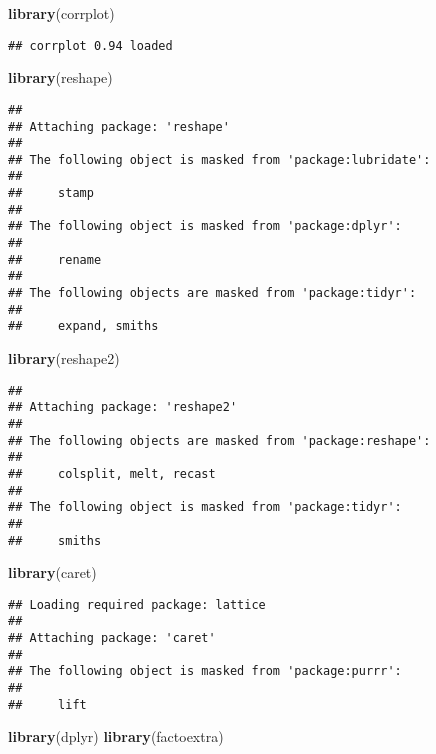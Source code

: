 \documentclass[
]{article}
\newenvironment{Shaded}{\begin{snugshade}}{\end{snugshade}}
\newcommand{\FunctionTok}[1]{\textcolor[rgb]{0.13,0.29,0.53}{\textbf{#1}}}
\newcommand{\NormalTok}[1]{#1}
\begin{document}
\begin{Shaded}
\begin{Highlighting}[]
\FunctionTok{library}\NormalTok{(corrplot)}
\end{Highlighting}
\end{Shaded}

\begin{verbatim}
## corrplot 0.94 loaded
\end{verbatim}

\begin{Shaded}
\begin{Highlighting}[]
\FunctionTok{library}\NormalTok{(reshape)}
\end{Highlighting}
\end{Shaded}

\begin{verbatim}
## 
## Attaching package: 'reshape'
## 
## The following object is masked from 'package:lubridate':
## 
##     stamp
## 
## The following object is masked from 'package:dplyr':
## 
##     rename
## 
## The following objects are masked from 'package:tidyr':
## 
##     expand, smiths
\end{verbatim}

\begin{Shaded}
\begin{Highlighting}[]
\FunctionTok{library}\NormalTok{(reshape2)}
\end{Highlighting}
\end{Shaded}

\begin{verbatim}
## 
## Attaching package: 'reshape2'
## 
## The following objects are masked from 'package:reshape':
## 
##     colsplit, melt, recast
## 
## The following object is masked from 'package:tidyr':
## 
##     smiths
\end{verbatim}

\begin{Shaded}
\begin{Highlighting}[]
\FunctionTok{library}\NormalTok{(caret)}
\end{Highlighting}
\end{Shaded}

\begin{verbatim}
## Loading required package: lattice
## 
## Attaching package: 'caret'
## 
## The following object is masked from 'package:purrr':
## 
##     lift
\end{verbatim}

\begin{Shaded}
\begin{Highlighting}[]
\FunctionTok{library}\NormalTok{(dplyr)}
\FunctionTok{library}\NormalTok{(factoextra)}
\end{Highlighting}
\end{Shaded}
\end{document}
